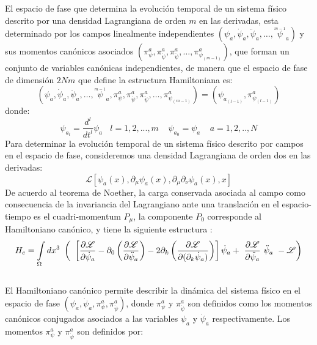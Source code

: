 \documentclass[a4paper,12pt]{article}
\begin{document}
El espacio de fase que determina la evolución temporal de un sistema físico descrito por una densidad Lagrangiana de orden $m$ en las derivadas, esta determinado por los campos linealmente independientes $(\psi_a,\dot \psi_a,\ddot \psi_a,\dotso,\overset{_{m-1}}{\psi}_a)$ y sus momentos canónicos asociados $(\pi^{a}_{\psi},\pi^{a}_{\dot\psi},\pi^{a}_{\ddot\psi},\dotso,\pi^{a}_{\psi_{(m-1)}})$, que forman un conjunto de variables canónicas independientes, de manera que el espacio de fase de dimensión $2Nm$ que define la estructura Hamiltoniana es:
\begin{equation}
(\psi_a,\dot \psi_a,\ddot \psi_a,\dotso,\overset{_{m-1}}{\psi}_a,\pi^{a}_{\psi},\pi^{a}_{\dot\psi},\pi^{a}_{\ddot\psi},\dotso,\pi^{a}_{\psi_{(m-1)}})=(\psi_{a_{(l-1)}},\pi^{a}_{\psi_{(l-1)}})
\label{fase} 
\end{equation}
donde: 
\begin{equation}
\psi_{a_l}=\frac{d^l}{dt^l}\psi_a \ \ \ \ l=1,2,...,m \ \ \ \ \ \psi_{a_0}=\psi_a \ \ \ \ \ a=1,2,..,N 
\end{equation}
Para determinar la evolución temporal de un sistema físico descrito por campos en el espacio de fase, consideremos una densidad Lagrangiana de orden dos en las derivadas:
\begin{equation}
\mathscr{L}[\psi_a(x),\partial_\mu\psi_a(x),\partial_\mu\partial_\nu\psi_a(x),x] 
\end{equation} 
De acuerdo al teorema de Noether, la carga conservada asociada al campo como consecuencia de la invariancia del Lagrangiano ante una translación en el \mbox{espacio-tiempo} es el cuadri-momentum $P_\mu$, la componente $P_0$ corresponde al Hamiltoniano canónico, y tiene la siguiente estructura \cite{general,greiner,hamilton}:
{\small\begin{equation}
H_c=\int\limits_{\Omega}dx^{3}\ \left(\\\ \left[\frac{\partial \mathscr{L} }{\partial\dot \psi_a}-\partial_{0}\left(\frac{\partial\mathscr{L} }{\partial\ddot \psi_a}  \right)-2\partial_{k}\left(\frac{\partial\mathscr{L} }{\partial(\partial_{k}\dot \psi_a)}  \right) \right] \dot\psi_a +\ \frac{\partial\mathscr{L} }{\partial\ddot \psi_a}\ \ddot\psi_a\ -\mathscr{L}\right) 
\end{equation}}\\
El Hamiltoniano canónico permite describir la dinámica del sistema físico en el espacio de fase $(\psi_a,\dot\psi_a,\pi^{a}_{\psi},\pi^{a}_{\dot\psi})$, donde $\pi^{a}_{\psi}$ y $\pi^{a}_{\dot\psi}$ son definidos como los momentos canónicos conjugados asociados a las variables $\psi_a$ y $\dot\psi_a$ respectivamente. Los momentos $\pi^{a}_{\psi}$ y $\pi^{a}_{\dot\psi}$ son definidos por:
\end{document}
